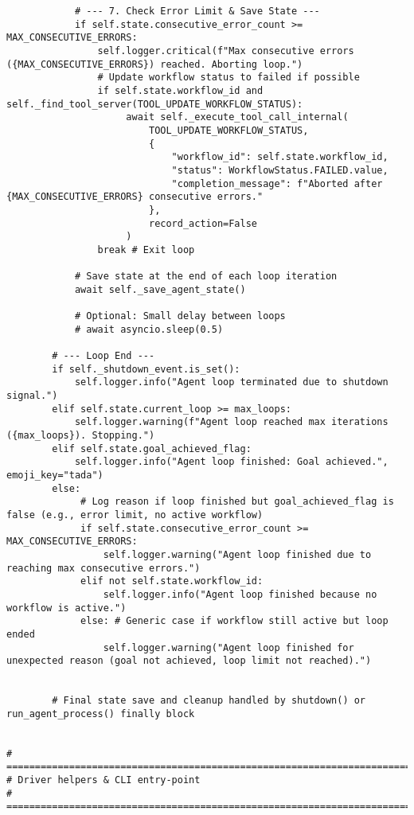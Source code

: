 \documentclass[12pt,a4paper]{article}
\begin{document}
\begin{pageablecode}
\begin{verbatim}
            # --- 7. Check Error Limit & Save State ---
            if self.state.consecutive_error_count >= MAX_CONSECUTIVE_ERRORS:
                self.logger.critical(f"Max consecutive errors ({MAX_CONSECUTIVE_ERRORS}) reached. Aborting loop.")
                # Update workflow status to failed if possible
                if self.state.workflow_id and self._find_tool_server(TOOL_UPDATE_WORKFLOW_STATUS):
                     await self._execute_tool_call_internal(
                         TOOL_UPDATE_WORKFLOW_STATUS,
                         {
                             "workflow_id": self.state.workflow_id,
                             "status": WorkflowStatus.FAILED.value,
                             "completion_message": f"Aborted after {MAX_CONSECUTIVE_ERRORS} consecutive errors."
                         },
                         record_action=False
                     )
                break # Exit loop

            # Save state at the end of each loop iteration
            await self._save_agent_state()

            # Optional: Small delay between loops
            # await asyncio.sleep(0.5)

        # --- Loop End ---
        if self._shutdown_event.is_set():
            self.logger.info("Agent loop terminated due to shutdown signal.")
        elif self.state.current_loop >= max_loops:
            self.logger.warning(f"Agent loop reached max iterations ({max_loops}). Stopping.")
        elif self.state.goal_achieved_flag:
            self.logger.info("Agent loop finished: Goal achieved.", emoji_key="tada")
        else:
             # Log reason if loop finished but goal_achieved_flag is false (e.g., error limit, no active workflow)
             if self.state.consecutive_error_count >= MAX_CONSECUTIVE_ERRORS:
                 self.logger.warning("Agent loop finished due to reaching max consecutive errors.")
             elif not self.state.workflow_id:
                 self.logger.info("Agent loop finished because no workflow is active.")
             else: # Generic case if workflow still active but loop ended
                 self.logger.warning("Agent loop finished for unexpected reason (goal not achieved, loop limit not reached).")


        # Final state save and cleanup handled by shutdown() or run_agent_process() finally block


# =============================================================================
# Driver helpers & CLI entry‑point
# =============================================================================


\end{verbatim}
\end{pageablecode}
\end{document}

